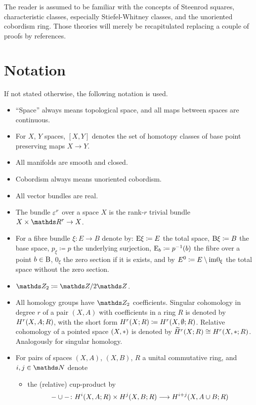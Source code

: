 The reader is assumed to be familiar with the concepts of Steenrod
squares, characteristic classes, especially Stiefel-Whitney classes,
and the unoriented cobordism ring. Those theories will merely be
recapitulated replacing a couple of proofs by references.

\section*{Notation}
If not stated otherwise, the following notation is used.
\begin{itemize}
\item \enquote{Space} always means topological space, and all maps
  between spaces are continuous.
\item For $X$, $Y$ spaces, $[X,Y]$ denotes the set of homotopy classes
  of base point preserving maps $X\to Y$.
\item All manifolds are smooth and closed.
\item Cobordism always means unoriented cobordism.
\item All vector bundles are real.
\item The bundle $\varepsilon^r$ over a space $X$ is the rank-$r$ trivial
  bundle $X\times\R^r\to X$.
\item For a fibre bundle $\xi\colon E\to B$ denote by:
  $\mathrm{E}\xi\coloneqq E$ the total space,
  $\mathrm{B}\xi\coloneqq B$ the base space,
  $p_\xi\coloneqq p$ the underlying surjection,
  $\mathrm{E}_b\coloneqq p^{-1}(b)$ the fibre over a point $b\in \B$,
  $0_\xi$ the zero section if it is exists, and by
  ${E}^0\coloneqq E\setminus\mathrm{im}0_{\xi}$
  the total space without the zero section.
\item $\Zmod2 \coloneqq \Z/2\Z$.
\item All homology groups have $\Zmod2$ coefficients. Singular
  cohomology in degree $r$ of a pair $(X,A)$ with 
  coefficients in a ring $R$ is denoted by $H^r(X,A;R)$, with the
  short form $H^r(X;R)\coloneqq H^r(X,\emptyset;R)$. Relative cohomology
  of a pointed space $(X,*)$ is denoted by
  $\widetilde{H}^r(X;R)\cong H^r(X,*;R)$.
  Analogously for singular homology.
\item For pairs of spaces $(X,A)$, $(X,B)$, $R$ a unital commutative
  ring, and $i,j\in\Nat$ denote
  \begin{itemize}
  \item the (relative) cup-product by
    \begin{align*}
      -\cup-\colon
      H^i(X,A;R)\times H^j(X,B;R) &\longto H^{i+j}(X,A\cup B;R)\\

\end{align*}
\end{itemize}
\end{itemize}
